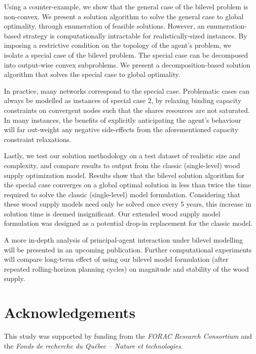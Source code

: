 Using a counter-example, we show that the general case of the bilevel problem is non-convex.
We present a solution algorithm to solve the general case to global optimality, through enumeration of feasible solutions.
However, an enumeration-based strategy is computationally intractable for realistically-sized instances.
By imposing a restrictive condition on the topology of the agent's problem, we isolate a special case of the bilevel problem. The special case can be decomposed into output-wise convex subproblems.
We present a decomposition-based solution algorithm that solves the special case to global optimality.

In practice, many networks correspond to the special case. 
Problematic cases can always be modelled as instances of special case 2, by relaxing binding capacity constraints on convergent nodes such that the shares resources are not saturated.
In many instances, the benefits of explicitly anticipating the agent's behaviour will far out-weight any negative side-effects from the aforementioned capacity constraint relaxations.

Lastly, we test our solution methodology on a test dataset of realistic size and complexity, and compare results to output from the classic (single-level) wood supply optimization model. 
Results show that the bilevel solution algorithm for the special case converges on a global optimal solution in less than twice the time required to solve the classic (single-level) model formulation.
Considering that these wood supply models need only be solved once every 5 years, this increase in solution time is deemed insignificant.
Our extended wood supply model formulation was designed as a potential drop-in replacement for the classic model.  

A more in-depth analysis of principal-agent interaction under bilevel modelling will be presented in an upcoming publication. Further computational experiments will compare long-term effect of using our bilevel model formulation (after repeated rolling-horizon planning cycles) on magnitude and stability of the wood supply.


\section{Acknowledgements}
\label{sec:acknowledgements2}

This study was supported by funding from the \emph{FORAC Research
  Consortium} and the \emph{Fonds de recherche du Qu\'{e}bec -- Nature
  et technologies}. 


